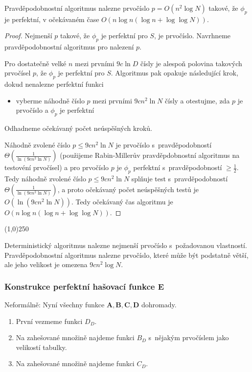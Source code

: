 \documentclass[a4paper,12pt]{article}
\newenvironment{myproof}{
  \begin{proof}
    
  }{
  \end{proof}
  \begin{center}
   \line(1,0){250}
   \end{center}
  }
\begin{document}
\begin{veta}
Pravděpodobnostní 
algoritmus nalezne pr\-vočíslo $p=O(n^2\log N)$ takové, že 
$\phi_p$ je perfektní, v očekáva\-ném čase 
$O(n\log n(\log n+\log\log N))$.
\end{veta}


\begin{myproof}
Nejmenší $p$ takové, že $\phi_p$ je perfektní 
pro $S$, 
je prvočíslo. Navrhneme pravděpodob\-nostní algoritmus 
pro nalezení $p$. 

Pro dostatečně velké $n$ mezi 
prvními $9c\ln D$ čísly je alespoň polovina tako\-vých 
prvočísel $p$, že $\phi_p$ je perfektní pro $S$. Algoritmus pak 
opakuje následující krok, dokud nenalezne perfektní funkci
\begin{itemize}
\item 
vyberme náhodně číslo $p$ mezi prvními $9cn^2\ln 
N$ 
čísly a otestujme, zda $p$ je prvočíslo a $\phi_p$ je perfektní
\end{itemize}

Odhadneme očekávaný počet neúspěšných kroků.

Náhodně zvolené číslo $p\le 9cn^2\ln N$ je prvočíslo s~pravděpo\-dob\-ností $\Theta (\frac 1{\ln(9cn^2\ln N)})$ 
(použi\-je\-me Rabin-Millerův pravděpdobnostní algoritmus na testovéní prvočísel) a pro prvočíslo $
p$ je $\phi_p$ 
perfektní s~prav\-dě\-po\-dob\-ností $\ge\frac 12$. Tedy náhodně zvolené 
číslo $p\le 9cn^2\ln N$ splňuje test s~pravdě\-po\-dob\-ností 
$\Theta (\frac 1{\ln(9cn^2\ln N)})$, a proto očeká\-va\-ný počet neúspěšných 
testů je $O(\ln(9cn^2\ln N))$. Tedy očeká\-vaný čas 
algoritmu je $O(n\log n(\log n+\log\log N))$.

\end{myproof}

\begin{pozorovani}Deterministický algoritmus nalezne nejmenší prvočíslo s~po\-ža\-dovanou vlastností.  Prav\-dě\-podobnostní algoritmus 
nalezne prvočíslo, které může být podstatně 
větší, ale jeho velikost je omezena $9cn^2\log N$. 
\end{pozorovani}

\subsubsection{Konstrukce perfektní hašovací funkce $\mathbf{E}$}

Neformálně: Nyní všechny funkce $\mathbf{A,B,C,D}$  dohromady.

\begin{enumerate}
\item První vezmeme funkci $D_D$.
\item Na zahešované množině najdeme funkci $B_D$ s~nějakým prvočíslem jako velikostí tabulky.
\item Na zahešované množině najdeme funkci $C_D$.
\end{enumerate}
\end{document}
